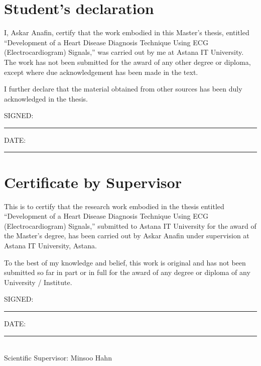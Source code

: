 \documentclass[12pt,a4paper]{report}
\begin{document}
\clearpage

\chapter*{Student's declaration}

I, Askar Anafin, certify that the work embodied in this Master's thesis, entitled ``Development of a Heart Disease Diagnosis Technique Using ECG (Electrocardiogram) Signals,'' was carried out by me at Astana IT University. The work has not been submitted for the award of any other degree or diploma, except where due acknowledgement has been made in the text.

I further declare that the material obtained from other sources has been duly acknowledged in the thesis.

\vspace{3cm}
\noindent
SIGNED: \rule{4cm}{0.5pt} \hfill DATE: \rule{4cm}{0.5pt}

\clearpage

\chapter*{Certificate by Supervisor}

This is to certify that the research work embodied in the thesis entitled ``Development of a Heart Disease Diagnosis Technique Using ECG (Electrocardiogram) Signals,'' submitted to Astana IT University for the award of the Master's degree, has been carried out by Askar Anafin under supervision at Astana IT University, Astana.

To the best of my knowledge and belief, this work is original and has not been submitted so far in part or in full for the award of any degree or diploma of any University / Institute.

\vspace{3cm}
\noindent
SIGNED: \rule{4cm}{0.5pt} \hfill DATE: \rule{4cm}{0.5pt} \\
\vspace{0.5cm}
\noindent
Scientific Supervisor: Minsoo Hahn
\end{document}
